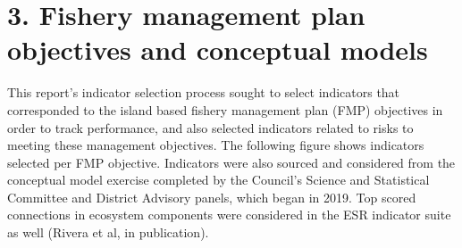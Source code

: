 \documentclass[
  letterpaper,
  oneside,
  open=any]{scrbook}
\begin{document}

\hypertarget{fishery-management-plan-objectives-and-conceptual-models}{%
\chapter{3. Fishery management plan objectives and conceptual
models}\label{fishery-management-plan-objectives-and-conceptual-models}}

This report's indicator selection process sought to select indicators
that corresponded to the island based fishery management plan (FMP)
objectives in order to track performance, and also selected indicators
related to risks to meeting these management objectives. The following
figure shows indicators selected per FMP objective. Indicators were also
sourced and considered from the conceptual model exercise completed by
the Council's Science and Statistical Committee and District Advisory
panels, which began in 2019. Top scored connections in ecosystem
components were considered in the ESR indicator suite as well (Rivera et
al, in publication).
\end{document}
